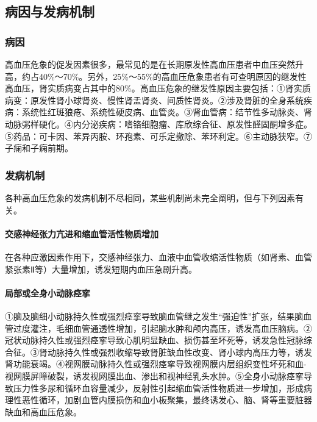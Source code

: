 \subsection{病因与发病机制}

\subsubsection{病因}

高血压危象的促发因素很多，最常见的是在长期原发性高血压患者中血压突然升高，约占40\%～70\%。另外，25\%～55\%的高血压危象患者有可查明原因的继发性高血压，肾实质病变占其中的80\%。高血压危象的继发性原因主要包括：①肾实质病变：原发性肾小球肾炎、慢性肾盂肾炎、间质性肾炎。②涉及肾脏的全身系统疾病：系统性红斑狼疮、系统性硬皮病、血管炎。③肾血管病：结节性多动脉炎、肾动脉粥样硬化。④内分泌疾病：嗜铬细胞瘤、库欣综合征、原发性醛固酮增多症。⑤药品：可卡因、苯异丙胺、环孢素、可乐定撤除、苯环利定。⑥主动脉狭窄。⑦子痫和子痫前期。

\subsubsection{发病机制}

各种高血压危象的发病机制不尽相同，某些机制尚未完全阐明，但与下列因素有关。

\paragraph{交感神经张力亢进和缩血管活性物质增加}

在各种应激因素作用下，交感神经张力、血液中血管收缩活性物质（如肾素、血管紧张素Ⅱ等）大量增加，诱发短期内血压急剧升高。

\paragraph{局部或全身小动脉痉挛}

①脑及脑细小动脉持久性或强烈痉挛导致脑血管继之发生“强迫性”扩张，结果脑血管过度灌注，毛细血管通透性增加，引起脑水肿和颅内高压，诱发高血压脑病。②冠状动脉持久性或强烈痉挛导致心肌明显缺血、损伤甚至坏死等，诱发急性冠脉综合征。③肾动脉持久性或强烈收缩导致肾脏缺血性改变、肾小球内高压力等，诱发肾功能衰竭。④视网膜动脉持久性或强烈痉挛导致视网膜内层组织变性坏死和血-视网膜屏障破裂，诱发视网膜出血、渗出和视神经乳头水肿。⑤全身小动脉痉挛导致压力性多尿和循环血容量减少，反射性引起缩血管活性物质进一步增加，形成病理性恶性循环，加剧血管内膜损伤和血小板聚集，最终诱发心、脑、肾等重要脏器缺血和高血压危象。

